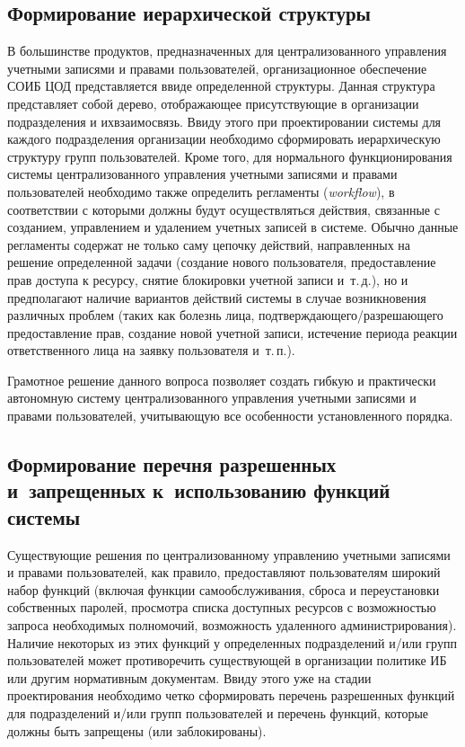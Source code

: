 \begin{multicols}{2}
\subsection{Формирование иерархической структуры}

       В большинстве продуктов, предназначенных для централизованного управления 
учетными записями и правами пользователей, организационное обеспечение СОИБ ЦОД 
представляется в\linebreak виде
определенной структуры. Данная структура\linebreak
представляет собой 
дерево, отображающее присутствующие в организации подразделения и их\linebreak взаимосвязь. 
Ввиду этого при проектировании сис\-те\-мы для каждого подразделения организации 
необходимо сформировать иерархическую структуру групп пользователей. Кроме того, 
для нормального функционирования сис\-те\-мы централизованного управления учетными 
записями и правами пользователей необходимо также определить регламенты 
(\textit{workflow}), в соответствии с которыми должны будут осуществляться действия, 
связанные с созданием, управлением и удалением учетных записей в сис\-те\-ме. Обычно 
данные регламенты содержат не только саму цепочку действий, направленных на решение 
определенной задачи (создание нового пользователя, предоставление прав доступа к 
ресурсу, снятие блокировки учетной записи и~т.\,д.), но и предполагают наличие 
вариантов действий сис\-те\-мы в случае возникновения различных проблем (таких как 
болезнь лица, подтверждающего/разрешающего предоставление прав, создание новой 
учетной записи, истечение периода реакции ответственного лица на заявку пользователя 
и~т.\,п.).
       
       Грамотное решение данного вопроса позволяет создать гибкую и практически 
автономную сис\-те\-му централизованного управления учетными записями и правами 
пользователей, учитывающую все особенности уста\-нов\-лен\-но\-го порядка.

\subsection{Формирование перечня разрешенных и~запрещенных к~использованию 
функций системы}

       Существующие решения по централизованному управлению учетными записями 
и правами пользователей, как правило, предоставляют пользователям широкий набор 
функций (включая функции\linebreak
самообслуживания, сброса и пе\-ре\-уста\-нов\-ки собственных 
паролей, просмотра списка доступных\linebreak
ресурсов с возможностью запроса необходимых 
полномочий, возможность удаленного администрирования). Наличие некоторых из этих 
функций у определенных подразделений и/или групп пользователей может противоречить 
существующей в организации политике ИБ или другим нормативным документам. Ввиду 
этого уже на стадии проектирования необходимо четко сформировать перечень 
разрешенных функций для подразделений и/или групп пользователей и перечень 
функций, которые должны быть запрещены (или заблокированы).
       

\end{multicols}

